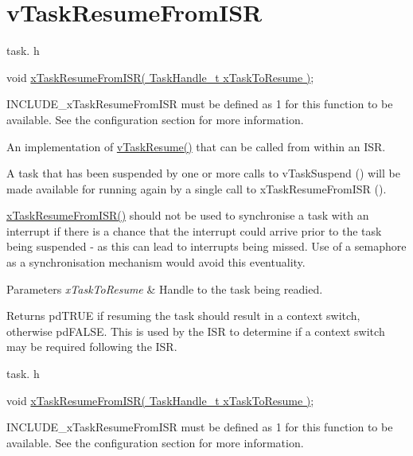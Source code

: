 \hypertarget{group__v_task_resume_from_i_s_r}{}\section{v\+Task\+Resume\+From\+I\+SR}
\label{group__v_task_resume_from_i_s_r}
task. h 
\begin{DoxyPre}
void \hyperlink{externals_2freertos_2include_2task_8h_aefbfd37c0661c3062fafd7334bff9aed}{xTaskResumeFromISR( TaskHandle\_t xTaskToResume )};
\end{DoxyPre}


I\+N\+C\+L\+U\+D\+E\+\_\+x\+Task\+Resume\+From\+I\+SR must be defined as 1 for this function to be available. See the configuration section for more information.

An implementation of \hyperlink{externals_2freertos_2include_2task_8h_a84a1584f29fb7736a1aa72ad5b3e9b44}{v\+Task\+Resume()} that can be called from within an I\+SR.

A task that has been suspended by one or more calls to v\+Task\+Suspend () will be made available for running again by a single call to x\+Task\+Resume\+From\+I\+SR ().

\hyperlink{externals_2freertos_2include_2task_8h_aefbfd37c0661c3062fafd7334bff9aed}{x\+Task\+Resume\+From\+I\+S\+R()} should not be used to synchronise a task with an interrupt if there is a chance that the interrupt could arrive prior to the task being suspended -\/ as this can lead to interrupts being missed. Use of a semaphore as a synchronisation mechanism would avoid this eventuality.


\begin{DoxyParams}{Parameters}
{\em x\+Task\+To\+Resume} & Handle to the task being readied.\\
\hline
\end{DoxyParams}
\begin{DoxyReturn}{Returns}
pd\+T\+R\+UE if resuming the task should result in a context switch, otherwise pd\+F\+A\+L\+SE. This is used by the I\+SR to determine if a context switch may be required following the I\+SR.
\end{DoxyReturn}
task. h 
\begin{DoxyPre}void \hyperlink{externals_2freertos_2include_2task_8h_aefbfd37c0661c3062fafd7334bff9aed}{xTaskResumeFromISR( TaskHandle\_t xTaskToResume )};\end{DoxyPre}


I\+N\+C\+L\+U\+D\+E\+\_\+x\+Task\+Resume\+From\+I\+SR must be defined as 1 for this function to be available. See the configuration section for more information.

